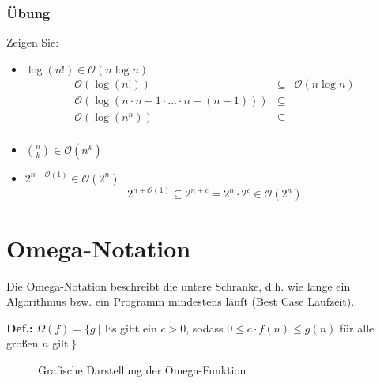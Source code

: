 \subsubsection{Übung}
Zeigen Sie:
\begin{itemize}
	\item \(\log(n!) \in \mathcal{O}(n \log n)\)
		\begin{eqnarray*}
			\mathcal{O}(\log(n!)) &\subseteq& \mathcal{O}(n \log n) \\
			\mathcal{O}(\log(n \cdot n-1 \cdot \ldots \cdot n-(n-1))) &\subseteq&	\\
			\mathcal{O}(\log(n^n)) &\subseteq&	\\
		\end{eqnarray*}
	\item \(\binom{n}{k} \in \mathcal{O}(n^k)\)
	\item \(2^{n+\mathcal{O}(1)} \in \mathcal{O}(2^n)\)
		\[2^{n+\mathcal{O}(1)} \subseteq 2^{n+c} = 2^n \cdot 2^c \in \mathcal{O}(2^n)\]
\end{itemize}



\section{Omega-Notation}
\label{sec:OmegaNotation}
Die Omega-Notation beschreibt die untere Schranke, d.h. wie lange ein Algorithmus bzw. ein Programm mindestens läuft (Best Case Laufzeit).
\begin{shaded}
	\noindent
	\textbf{Def.:} \(\Omega(f) = \{ g \:|\) Es gibt ein \(c > 0\), sodass \(0 \leq c \cdot f(n) \leq g(n)\) für alle großen \(n\) gilt.\(\}\)
\end{shaded}

\begin{figure}[htbp]
	\begin{center}
	\end{center}
	\label{img:OmegaNotation}
	\caption{Grafische Darstellung der Omega-Funktion}
\end{figure}

